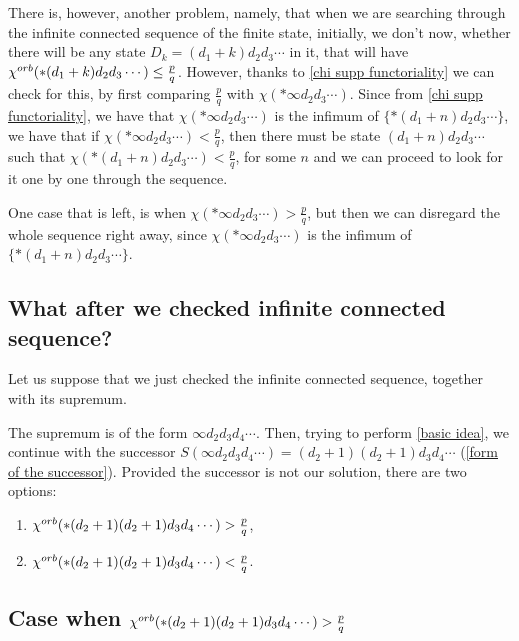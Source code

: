 There is, however, another problem, namely, that when we are searching through 
the infinite connected sequence of the finite state, 
initially, we don't now, whether there will be any state 
$D_k = (d_1+k)d_2d_3\cdots$ in it, that 
will have ${\chi^{orb}(*(d_1+k)d_2d_3\cdots)} \leq \frac{p}{q}$. 
However, thanks to \ref{chi supp functoriality} 
we can check for this, by first comparing $\frac{p}{q}$ with $\chi(*\infty d_2d_3\cdots)$. 
Since from \ref{chi supp functoriality}, we have that 
$\chi(*\infty d_2d_3\cdots)$ is the infimum of $\{*(d_1+n)d_2d_3\cdots\}$, 
we have that if $\chi(*\infty d_2d_3\cdots) < \frac{p}{q}$, then
there must be state $(d_1+n)d_2d_3\cdots$ such that $\chi(*(d_1+n)d_2d_3\cdots) < \frac{p}{q}$, 
for some $n$ and we can proceed to look for it one by one through the sequence.

One case that is left, is when $\chi(*\infty d_2d_3\cdots) > \frac{p}{q}$, but then we can 
disregard the whole sequence right away, since 
$\chi(*\infty d_2d_3\cdots)$ is the infimum of $\{*(d_1+n)d_2d_3\cdots\}$.

\subsection{What after we checked infinite connected sequence?}
Let us suppose that we just checked the infinite connected sequence, together with its supremum. 


The supremum is of the form $\infty d_2 d_3d_4\cdots$.
Then, trying to perform \ref{basic idea}, 
we continue with the successor $S(\infty d_2 d_3d_4\cdots) = (d_2+1)(d_2+1)d_3d_4\cdots$ 
(\ref{form of the successor}). Provided the successor is not our solution, 
there are two options:
\begin{enumerate} 
\item ${\chi^{orb}(*(d_2+1)(d_2+1)d_3d_4\cdots)} > \frac{p}{q}$,
\item ${\chi^{orb}(*(d_2+1)(d_2+1)d_3d_4\cdots)} < \frac{p}{q}$.
\end{enumerate} 

\subsection{Case when \texorpdfstring{${\chi^{orb}(*(d_2+1)(d_2+1)d_3d_4\cdots)} > \frac{p}{q}$}
{chi^orb(*(d_2+1)(d_2+1)d_3d_4... > p/q)}}\label{greater idea}

